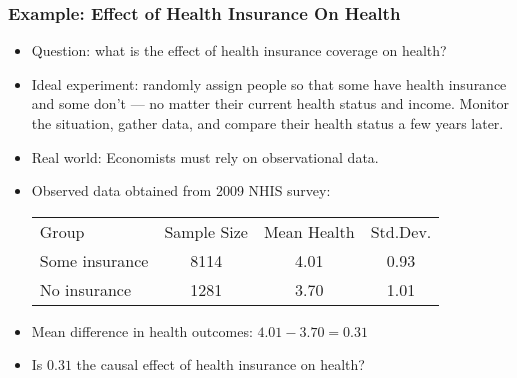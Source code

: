 

\begin{frame}
\frametitle{Example: Effect of Health Insurance On Health}
\begin{itemize}
\item Question: what is the effect of health insurance coverage on health?
\item Ideal experiment: randomly assign people so that some have health insurance and some don't --- no matter their current health status and income. Monitor the situation, gather data, and compare their health status a few years later. 
\item Real world: Economists must rely on observational data.
\item Observed data obtained from 2009 NHIS survey:
\begin{center}
\begin{tabular}{lccc} 
\toprule
Group & Sample Size & Mean Health & Std.Dev. \\
Some insurance & 8114 & 4.01 & 0.93 \\
No insurance & 1281 & 3.70 & 1.01 \\ 
\bottomrule
\end{tabular}
\end{center}
\item Mean difference in health outcomes: $4.01 - 3.70 = 0.31$
\item Is $0.31$ the causal effect of health insurance on health?
\end{itemize}
\end{frame}


